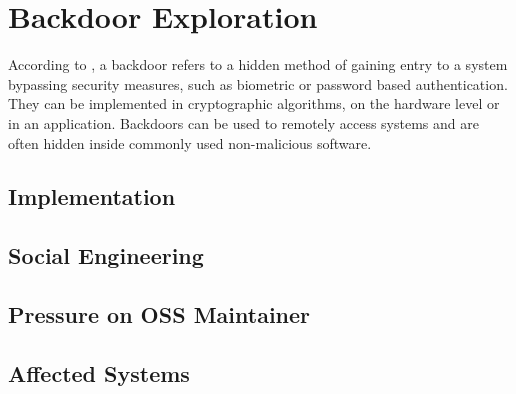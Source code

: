\section{Backdoor Exploration}

According to \cite{wysopal2007static}, a backdoor refers to a hidden method of
gaining entry to a system bypassing security measures, such as biometric or
password based authentication. They can be implemented in cryptographic
algorithms, on the hardware level or in an application. Backdoors can be used
to remotely access systems and are often hidden inside commonly used
non-malicious software.

\subsection{Implementation}
\subsection{Social Engineering}
\subsection{Pressure on OSS Maintainer}
\subsection{Affected Systems}
